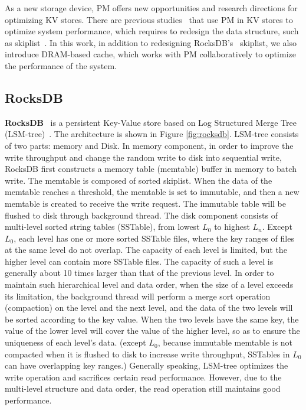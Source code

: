 As a new storage device, PM offers new opportunities and research directions for optimizing KV stores. There are previous studies~\cite{NVMRocks,DBLP:conf/usenix/KannanBGAA18,DBLP:conf/usenix/XiaJXS17} that use PM in KV stores to optimize system performance, which requires to redesign the data structure, such as skiplist~\cite{DBLP:conf/usenix/KannanBGAA18, SLMDB}. In this work, in addition to redesigning RocksDB's~\cite{RocksDB} skiplist, we also introduce DRAM-based cache, which works with PM collaboratively to optimize the performance of the system.
\subsection{RocksDB}
\textbf{RocksDB}~\cite{RocksDB} is a persistent Key-Value store based on Log Structured Merge Tree (LSM-tree)~\cite{LSM-tree}. The architecture is shown in Figure \ref{fig:rocksdb}. LSM-tree consists of two parts: memory and Disk. In memory component, in order to improve the write throughput and change the random write to disk into sequential write, RocksDB first constructs a memory table (memtable) buffer in memory to batch write. The memtable is composed of sorted skiplist. When the data of the memtable reaches a threshold, the memtable is set to immutable, and then a new memtable is created to receive the write request. The immutable table will be flushed to disk through background thread. The disk component consists of multi-level sorted string tables (SSTable), from lowest $L_0$ to highest $L_n$. Except $L_0$, each level has one or more sorted SSTable files, where the key ranges of files at the same level do not overlap. The capacity of each level is limited, but the higher level can contain more SSTable files. The capacity of such a level is generally about 10 times larger than that of the previous level. In order to maintain such hierarchical level and data order, when the size of a level exceeds its limitation, the background thread will perform a merge sort operation (compaction) on the level and the next level, and the data of the two levels will be sorted according to the key value. When the two levels have the same key, the value of the lower level will cover the value of the higher level, so as to ensure the uniqueness of each level's data. (except $L_0$, because immutable memtable is not compacted when it is flushed to disk to increase write throughput, SSTables in $L_0$ can have overlapping key ranges.) Generally speaking, LSM-tree optimizes the write operation and sacrifices certain read performance. However, due to the multi-level structure and data order, the read operation still maintains good performance.

